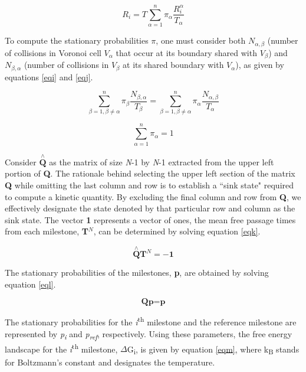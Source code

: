 \documentclass[9pt,training,pubversion]{livecoms}
\begin{document}
\begin{equation}
R_{i} = T \sum_{\alpha=1}^{n} \pi_{\alpha} \frac{R_{i}^{ \alpha}}{T_{\alpha}}
\label{eqh}
\end{equation}

\noindent To compute the stationary probabilities \textbf{$\pi$}, one must consider both $N_{\alpha,\beta}$ (number of collisions in Voronoi cell $V_{\alpha}$ that occur at its boundary shared with $V_{\beta}$) and $N_{\beta,\alpha}$ (number of collisions in $V_{\beta}$ at its shared boundary with $V_{\alpha}$), as given by equations \ref{eqi} and \ref{eqj}.

\begin{equation}
\sum_{\beta=1, \beta \neq \alpha}^{n} \pi_{\beta} \frac{N_{\beta, \alpha}} {T_{\beta}} = \sum_{\beta=1, \beta \neq \alpha}^{n} \pi_{\alpha} \frac{N_{\alpha, \beta}} {T_{\alpha}}
\label{eqi}
\end{equation}

\begin{equation}
\sum_{\alpha=1}^{n} \pi_{\alpha} = 1
\label{eqj}
\end{equation}

\noindent Consider $\overset{\wedge}{\textbf{Q}}$ as the matrix of size \textit{N}-1 by \textit{N}-1 extracted from the upper left portion of \textbf{Q}. The rationale behind selecting the upper left section of the matrix \textbf{Q} while omitting the last column and row is to establish a “sink state" required to compute a kinetic quantity. By excluding the final column and row from \textbf{Q}, we effectively designate the state denoted by that particular row and column as the sink state. The vector \textbf{1} represents a vector of ones, the mean free passage times from each milestone, \textbf{T}$^{N}$, can be determined by solving equation \ref{eqk}.

\begin{equation}
\overset{\wedge}{\textbf{Q}} \textbf{T}^{N} = - \textbf{1}
\label{eqk}
\end{equation}

\noindent The stationary probabilities of the milestones, \textbf{p}, are obtained by solving equation \ref{eql}.

\begin{equation}
\textbf{Q}\textbf{p}=\textbf{p}
\label{eql}
\end{equation}

\noindent The stationary probabilities for the \textit{i}\textsuperscript{th} milestone and the reference milestone are represented by {\textit{p\textsubscript{i}}} and {\textit{p\textsubscript{ref}}}, respectively. Using these parameters, the free energy landscape for the \textit{i}\textsuperscript{th} milestone, $\Delta$G\textsubscript{i}, is given by equation \ref{eqm}, where k\textsubscript{$\mathrm{B}$} stands for Boltzmann's constant and  designates the temperature. 
\end{document}
